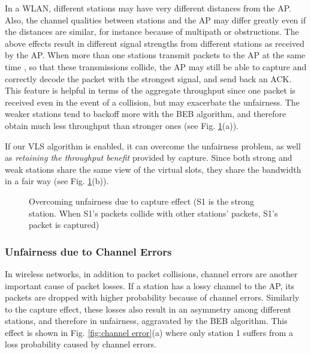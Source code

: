 \documentclass[letterpaper, 10 pt, conference]{ieeeconf}
\begin{document}
In a WLAN, different stations may have very different distances from
the AP. Also, the channel qualities between stations and the AP may
differ greatly even if the distances are similar, for instance because of multipath
or obstructions. The above effects result in different signal strengths
from different stations as received by the AP. When more than one
stations transmit packets to the AP at the same time , so that these
transmissions collide, the AP may still be able to
capture and correctly decode the packet with the strongest signal,
and send back an ACK. This feature is helpful in terms of the aggregate
throughput since one packet is received even in the event of a collision, but may
exacerbate the unfairness. The weaker stations tend to backoff more
with the BEB algorithm, and therefore obtain much less throughput than stronger ones
(see Fig. \ref{fig:capture}(a)).

If our VLS algorithm is enabled, it can overcome the unfairness problem,
as well as \emph{retaining the throughput benefit} provided by capture. Since both strong and weak stations
share the same view of the virtual slots, they share the bandwidth
in a fair way (see Fig. \ref{fig:capture}(b)).

\begin{figure}


\caption{\label{fig:capture}Overcoming unfairness due to capture effect (S1 is the strong station. When S1's packets collide with other stations' packets, S1's packet is captured)}

\end{figure}



\subsubsection{Unfairness due to Channel Errors}

In wireless networks, in addition to packet collisions, channel errors are another
important cause of packet losses. If a station has a lossy
channel to the AP, its packets are dropped with higher probability
because of channel errors. Similarly to the capture effect, these losses also result in
an asymmetry among different stations, and therefore in unfairness, aggravated
by the BEB algorithm. This effect is shown in Fig. \ref{fig:channel error}(a) where
only station 1 suffers from a loss probability  caused by
channel errors.
\end{document}
